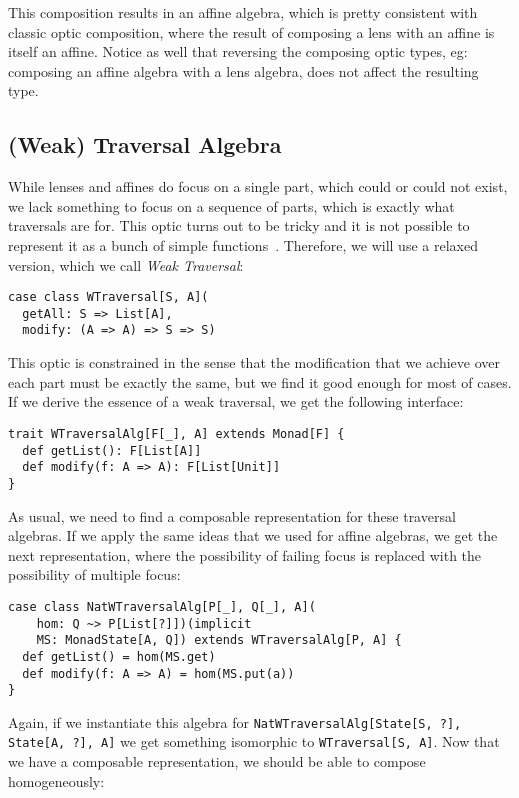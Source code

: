 \documentclass[final, twocolumn, 3p]{elsarticle}
\begin{document}
This composition results in an affine algebra, which is pretty consistent with
classic optic composition, where the result of composing a lens with an affine
is itself an affine. Notice as well that reversing the composing optic types,
eg: composing an affine algebra with a lens algebra, does not affect the
resulting type.

\subsection{(Weak) Traversal Algebra}

While lenses and affines do focus on a single part, which could or could not
exist, we lack something to focus on a sequence of parts, which is exactly what
traversals are for. This optic turns out to be tricky and it is not possible to
represent it as a bunch of simple functions~\cite{oconnor2011functor}.
Therefore, we will use a relaxed version, which we call \emph{Weak Traversal}:

\begin{lstlisting}
case class WTraversal[S, A](
  getAll: S => List[A],
  modify: (A => A) => S => S)
\end{lstlisting}

This optic is constrained in the sense that the modification that we achieve
over each part must be exactly the same, but we find it good enough for most of
cases. If we derive the essence of a weak traversal, we get the following
interface:

\begin{lstlisting}
trait WTraversalAlg[F[_], A] extends Monad[F] {
  def getList(): F[List[A]]
  def modify(f: A => A): F[List[Unit]]
}
\end{lstlisting}

As usual, we need to find a composable representation for these traversal
algebras. If we apply the same ideas that we used for affine algebras, we get
the next representation, where the possibility of failing focus is replaced with
the possibility of multiple focus:

\begin{lstlisting}
case class NatWTraversalAlg[P[_], Q[_], A](
    hom: Q ~> P[List[?]])(implicit
    MS: MonadState[A, Q]) extends WTraversalAlg[P, A] {
  def getList() = hom(MS.get)
  def modify(f: A => A) = hom(MS.put(a))
}
\end{lstlisting}

Again, if we instantiate this algebra for
\lstinline{NatWTraversalAlg[State[S, ?], State[A, ?], A]} we get something
isomorphic to \lstinline{WTraversal[S, A]}. Now that we have a composable
representation, we should be able to compose homogeneously:
\end{document}
